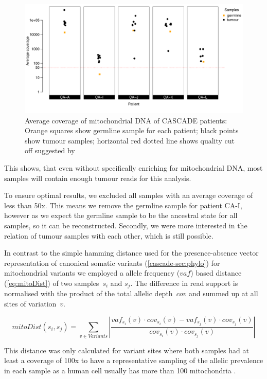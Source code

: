 \begin{figure}[!ht]
\centering
\includegraphics[width=.99\linewidth]{Figures/mtCoverage}
\vspace{-1em}
\caption[Average coverage of mitochondrial DNA of CASCADE patients]{Average coverage of mitochondrial DNA of CASCADE patients: Orange squares show germline sample for each patient; black points show tumour samples; horizontal red dotted line shows quality cut off suggested by \protect\textcite{Ludwig2019}} \label{fig:cas86schematic}
\end{figure}

This shows, that even without specifically enriching for mitochondrial DNA, most samples will contain enough tumour reads for this analysis.

To ensure optimal results, we excluded all samples with an average coverage of less than 50x. This means we remove the germline sample for patient CA-I, however as we expect the germline sample to be the ancestral state for all samples, so it can be reconstructed. Secondly, we were more interested in the relation of tumour samples with each other, which is still possible.

In contrast to the simple hamming distance used for the presence-absence vector representation of canonical somatic variants (\autoref{cascade-sec:phylo}) for mitochondrial variants we employed a allele frequency ($vaf$) based distance (\autoref{eq:mitoDist}) of two samples~$s_i$ and $s_j$. The difference in read support is normalised with the product of the total allelic depth~$cov$ and summed up at all sites of variation~$v$.

\begin{equation}
mitoDist(s_i,s_j) = \sum_{v \in Variants} \left| \frac{vaf_{s_i}(v) \cdot cov_{s_i}(v) - vaf_{s_j}(v) \cdot cov_{s_j}(v)}{cov_{s_i}(v) \cdot cov_{s_j}(v)} \right| \label{eq:mitoDist}
\end{equation}
\myequation[\ref{eq:mitoDist}]{Mitochondrial variants based distance function of two samples}

This distance was only calculated for variant sites where both samples had at least a coverage of 100x to have a representative sampling of the allelic prevalence in each sample as a human cell usually has more than 100 mitochondria \cite{Cole2016}.